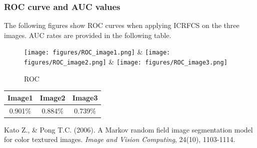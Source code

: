 \documentclass[english]{article}\usepackage{graphicx, color}
\numberwithin{equation}{section}
\numberwithin{figure}{section}
\begin{document}
\subsubsection{ROC curve and AUC values}
The following figures show ROC curves when applying ICRFCS on the three images. AUC rates are provided in the following table.
\begin{figure}[!h]
  \begin{center}
    \texttt{[image: figures/ROC\_image1.png]} & 
    \texttt{[image: figures/ROC\_image2.png]} &
    \texttt{[image: figures/ROC\_image3.png]} \\
  \end{center}
  \caption{ROC}
  \label{fig:ROC}
\end{figure}

\begin{center}
 \begin{tabular}{||c c c||} 
 \hline
 Image1 & Image2 & Image3 \\ [0.5ex] 
 \hline\hline
 0.901\% & 0.884\% & 0.739\% \\ [1ex] 
 \hline
\end{tabular}
\end{center}

\begin{thebibliography}{9}

  Kato Z., \& Pong T.C. (2006).
  A Markov random field image segmentation model for color textured images.
  \emph{Image and Vision Computing}, 24(10), 1103-1114.

\end{thebibliography}
\end{document}
